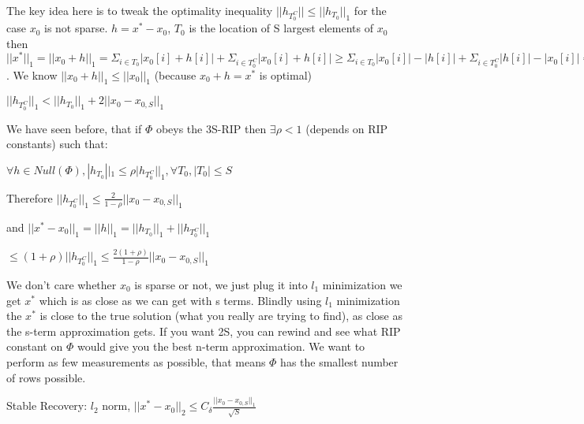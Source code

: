 \documentclass[12pt,letterpaper]{report}
\begin{document}
The key idea here is to tweak the optimality inequality $||h_{T_0^C}|| \leq ||h_{T_0}||_1$ for the case $x_0$ is not sparse.  $h = x^* - x_0$, $T_0$ is the location of S largest elements of $x_0$ then $||x^*||_1 = ||x_0 + h||_1 = \Sigma_{i \in T_0} |x_0[i] + h[i]| + \Sigma_{i \in T_0^C} |x_0[i] + h[i]| \geq \Sigma_{i \in T_0} |x_0[i]| - |h[i]| + \Sigma_{i \in T_0^C} |h[i]| - |x_0[i]| = ||x_0||_1 - 2\Sigma_{i \in T_0^C} |x[i]| - ||h_{T_0}||_1 + ||h_{T_0^C}||_1 = ||x_0||_1 - 2\Sigma_{i \in T_0^C}|x[i]| - ||h_{T_0}||_1 + ||h_{T_0^C}||_1 = ||x_0||_1 - ||h_{T_0}||_1 + ||h_{T_0^C}||_1 - 2||x_0 - x_{0,S}||_1$.  We know $||x_0 + h||_1 \leq ||x_0||_1$ (because $x_0 + h = x^*$ is optimal)

$||h_{T_0^C}||_1 < ||h_{T_0}||_1 + 2||x_0 - x_{0,S}||_1$

We have seen before, that if $\Phi$ obeys the 3S-RIP then $\exists \rho < 1$ (depends on RIP constants) such that:

$\forall h \in Null(\Phi), |h_{T_0}||_1 \leq \rho |h_{T_0^C}||_1, \forall T_0, |T_0| \leq S$

Therefore $||h_{T_0^C}||_1 \leq \frac{2}{1-\rho} ||x_0 - x_{0,S}||_1$

and $||x^* - x_0||_1 = ||h||_1 = ||h_{T_0}||_1 + ||h_{T_0^C}||_1$

$\leq (1 + \rho) ||h_{T_0^C}||_1 \leq \frac{2(1+\rho)}{1-\rho} ||x_0 - x_{0,S}||_1$

We don't care whether $x_0$ is sparse or not, we just plug it into $l_1$ minimization we get $x^*$ which is as close as we can get with s terms.  Blindly using $l_1$ minimization the $x^*$ is close to the true solution (what you really are trying to find), as close as the s-term approximation gets.  If you want 2S, you can rewind and see what RIP constant on $\Phi$ would give you the best n-term approximation.  We want to perform as few measurements as possible, that means $\Phi$ has the smallest number of rows possible.


Stable Recovery: $l_2$ norm, $||x^* - x_0||_2 \leq C_\delta \frac{||x_0 - x_{0,S}||_1}{\sqrt{S}}$
\end{document}
